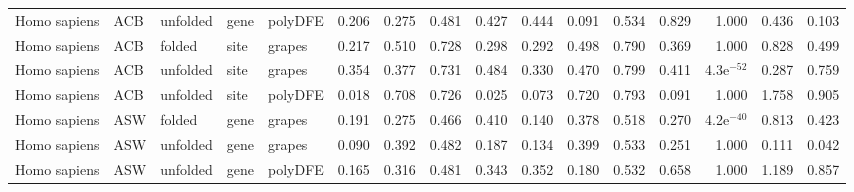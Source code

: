 \begin{longtable}{lllllrrrrrrrrrrr}
        Homo sapiens &                       ACB &  unfolded &  gene &  polyDFE &                              0.206 &                               0.275 &                 0.481 &                 0.427 &                              0.444 &                               0.091 &                 0.534 &                 0.829 &         1.000 &  0.436 &  0.103 \\
        Homo sapiens &                       ACB &    folded &  site &   grapes &                              0.217 &                               0.510 &                 0.728 &                 0.298 &                              0.292 &                               0.498 &                 0.790 &                 0.369 &         1.000 &  0.828 &  0.499 \\
        Homo sapiens &                       ACB &  unfolded &  site &   grapes &                              0.354 &                               0.377 &                 0.731 &                 0.484 &                              0.330 &                               0.470 &                 0.799 &                 0.411 &  4.3e$^{-52}$ &  0.287 &  0.759 \\
        Homo sapiens &                       ACB &  unfolded &  site &  polyDFE &                              0.018 &                               0.708 &                 0.726 &                 0.025 &                              0.073 &                               0.720 &                 0.793 &                 0.091 &         1.000 &  1.758 &  0.905 \\
        Homo sapiens &                       ASW &    folded &  gene &   grapes &                              0.191 &                               0.275 &                 0.466 &                 0.410 &                              0.140 &                               0.378 &                 0.518 &                 0.270 &  4.2e$^{-40}$ &  0.813 &  0.423 \\
        Homo sapiens &                       ASW &  unfolded &  gene &   grapes &                              0.090 &                               0.392 &                 0.482 &                 0.187 &                              0.134 &                               0.399 &                 0.533 &                 0.251 &         1.000 &  0.111 &  0.042 \\
        Homo sapiens &                       ASW &  unfolded &  gene &  polyDFE &                              0.165 &                               0.316 &                 0.481 &                 0.343 &                              0.352 &                               0.180 &                 0.532 &                 0.658 &         1.000 &  1.189 &  0.857 \\

\end{longtable}
